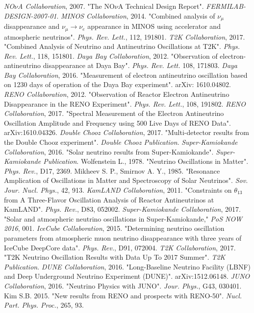 \documentclass[english]{article}
\begin{document}
\begin{thebibliography}{99}
    \textit{NO$\nu$A Collaboration}, 2007. "The NO$\nu$A Technical Design Report". \textit{FERMILAB-DESIGN-2007-01}.
    \textit{MINOS Collaboration}, 2014. "Combined analysis of $\nu_{\mu}$ disappearance and $\nu_{\mu} \rightarrow \nu_{e}$ appearance in MINOS using
accelerator and atmospheric neutrinos". \textit{Phys. Rev. Lett.}, 112, 191801.
    \textit{T2K Collaboration}, 2017. "Combined Analysis of Neutrino and Antineutrino Oscillations at T2K". \textit{Phys. Rev. Lett.}, 118, 151801.
    \textit{Daya Bay Collaboration}, 2012. "Observation of electron-antineutrino disappearance at Daya Bay". \textit{Phys. Rev. Lett.} 108, 171803.
    \textit{Daya Bay Collaboration}, 2016. "Measurement of electron antineutrino oscillation based on 1230 days of operation of the Daya Bay experiment". arXiv: 1610.04802.
    \textit{RENO Collaboration}, 2012. "Observation of Reactor Electron Antineutrino Disappearance in the RENO Experiment". \textit{Phys. Rev. Lett.}, 108, 191802.
    \textit{RENO Collaboration}, 2017. "Spectral Measurement of the Electron Antineutrino Oscillation Amplitude and Frequency using 500 Live Days of RENO Data". arXiv:1610.04326.
    \textit{Double Chooz Collaboration}, 2017. "Multi-detector results from the Double Chooz experiment". \textit{Double Chooz Publication}.
    \textit{Super-Kamiokande Collaboration}, 2016. "Solar neutrino results from Super-Kamiokande". \textit{Super-Kamiokande Publication}.
    Wolfenstein L., 1978. "Neutrino Oscillations in Matter". \textit{Phys. Rev.}, D17, 2369.
    Mikheev S. P., Smirnov A. Y., 1985. "Resonance Amplication of Oscillations in Matter and Spectroscopy of Solar Neutrinos". \textit{Sov. Jour. Nucl. Phys.}, 42, 913.
    \textit{KamLAND Collaboration}, 2011. "Constraints on $\theta_{13}$ from A Three-Flavor Oscillation Analysis of Reactor Antineutrinos at KamLAND". \textit{Phys. Rev.}, D83, 052002.
    \textit{Super-Kamiokande Collaboration}, 2017. "Solar and atmospheric neutrino oscillations in Super-Kamiokande," \textit{PoS NOW 2016}, 001.
    \textit{IceCube Collaboration}, 2015. "Determining neutrino oscillation parameters from atmospheric muon neutrino disappearance with three years of IceCube DeepCore data". \textit{Phys. Rev.}, D91, 072004.
    \textit{T2K Collaboration}, 2017. "T2K Neutrino Oscillation Results with Data Up To 2017 Summer". \textit{T2K Publication}.
    \textit{DUNE Collaboration}, 2016. "Long-Baseline Neutrino Facility (LBNF) and Deep Underground Neutrino Experiment (DUNE)". arXiv:1512.06148.
    \textit{JUNO Collaboration}, 2016. "Neutrino Physics with JUNO". \textit{Jour. Phys.}, G43, 030401.
    Kim S.B. 2015. "New results from RENO and prospects with RENO-50". \textit{Nucl. Part. Phys. Proc.}, 265, 93.
    
\end{thebibliography}
\end{document}
